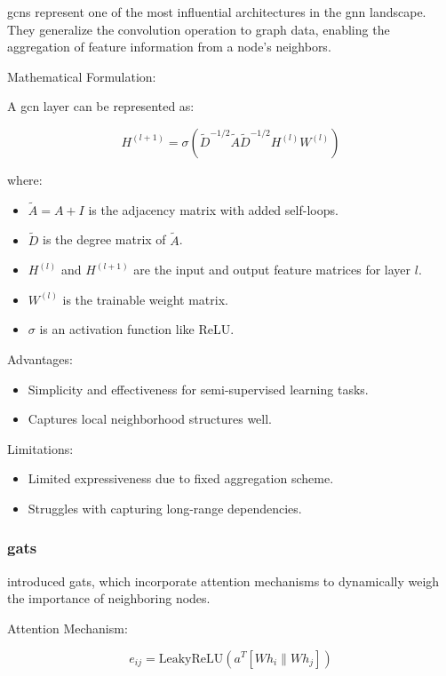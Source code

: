 \glspl{gcn} represent one of the most influential architectures in the \gls{gnn} landscape. They generalize the convolution operation to graph data, enabling the aggregation of feature information from a node's neighbors.

Mathematical Formulation:

A \gls{gcn} layer can be represented as:

\[ H^{(l+1)} = \sigma\left(\tilde{D}^{-1/2}\tilde{A}\tilde{D}^{-1/2} H^{(l)} W^{(l)}\right) \]

where:
\begin{itemize}
    \item \( \tilde{A} = A + I \) is the adjacency matrix with added self-loops.
    \item \( \tilde{D} \) is the degree matrix of \( \tilde{A} \).
    \item \( H^{(l)} \) and \( H^{(l+1)} \) are the input and output feature matrices for layer \( l \).
    \item \( W^{(l)} \) is the trainable weight matrix.
    \item \( \sigma \) is an activation function like ReLU.
\end{itemize}


Advantages:
\begin{itemize}
    \item Simplicity and effectiveness for semi-supervised learning tasks.
    \item Captures local neighborhood structures well.
\end{itemize}


Limitations:
\begin{itemize}
    \item Limited expressiveness due to fixed aggregation scheme.
    \item Struggles with capturing long-range dependencies.
\end{itemize}

\subsubsection*{\glspl{gat}}

\cite{Velickovic2018} introduced \glspl{gat}, which incorporate attention mechanisms to dynamically weigh the importance of neighboring nodes.

Attention Mechanism:

\[ e_{ij} = \text{LeakyReLU}\left(a^T [W h_i \| W h_j]\right) \]

